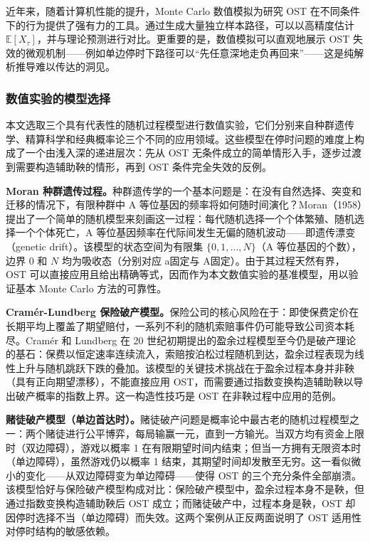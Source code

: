 近年来，随着计算机性能的提升，Monte Carlo 数值模拟为研究 OST 在不同条件下的行为提供了强有力的工具。通过生成大量独立样本路径，可以以高精度估计 $\mathbb{E}[X_\tau]$，并与理论预测进行对比。更重要的是，数值模拟可以直观地展示 OST 失效的微观机制——例如单边停时下路径可以``先任意深地走负再回来''——这是纯解析推导难以传达的洞见。

\subsubsection{数值实验的模型选择}

本文选取三个具有代表性的随机过程模型进行数值实验，它们分别来自种群遗传学、精算科学和经典概率论三个不同的应用领域。这些模型在停时问题的难度上构成了一个由浅入深的递进层次：先从 OST 无条件成立的简单情形入手，逐步过渡到需要构造辅助鞅的情形，再到 OST 条件完全失效的反例。

\smallskip
\noindent\textbf{Moran 种群遗传过程。}\quad 种群遗传学的一个基本问题是：在没有自然选择、突变和迁移的情况下，有限种群中 A 等位基因的频率将如何随时间演化？Moran（1958）提出了一个简单的随机模型来刻画这一过程：每代随机选择一个个体繁殖、随机选择一个个体死亡，A 等位基因频率在代际间发生无偏的随机波动——即遗传漂变（genetic drift）。该模型的状态空间为有限集 $\{0, 1, \dots, N\}$（A 等位基因的个数），边界 0 和 $N$ 均为吸收态（分别对应 a固定与 A固定）。由于其过程天然有界，OST 可以直接应用且给出精确等式，因而作为本文数值实验的基准模型，用以验证基本 Monte Carlo 方法的可靠性。

\smallskip
\noindent\textbf{Cram\'{e}r-Lundberg 保险破产模型。}\quad 保险公司的核心风险在于：即使保费定价在长期平均上覆盖了期望赔付，一系列不利的随机索赔事件仍可能导致公司资本耗尽。Cram\'{e}r 和 Lundberg 在 20 世纪初期提出的盈余过程模型至今仍是破产理论的基石：保费以恒定速率连续流入，索赔按泊松过程随机到达，盈余过程表现为线性上升与随机跳跃下跌的叠加。该模型的关键技术挑战在于盈余过程本身并非鞅（具有正向期望漂移），不能直接应用 OST，而需要通过指数变换构造辅助鞅以导出破产概率的指数上界。这一构造性技巧是 OST 在非鞅过程中应用的范例。

\smallskip
\noindent\textbf{赌徒破产模型（单边首达时）。}\quad 赌徒破产问题是概率论中最古老的随机过程模型之一：两个赌徒进行公平博弈，每局输赢一元，直到一方输光。当双方均有资金上限时（双边障碍），游戏以概率 1 在有限期望时间内结束；但当一方拥有无限资本时（单边障碍），虽然游戏仍以概率 1 结束，其期望时间却发散至无穷。这一看似微小的变化——从双边障碍变为单边障碍——使得 OST 的三个充分条件全部崩溃。该模型恰好与保险破产模型构成对比：保险破产模型中，盈余过程本身不是鞅，但通过指数变换构造辅助鞅后 OST 成立；而赌徒破产中，过程本身是鞅，OST 却因停时选择不当（单边障碍）而失效。这两个案例从正反两面说明了 OST 适用性对停时结构的敏感依赖。

